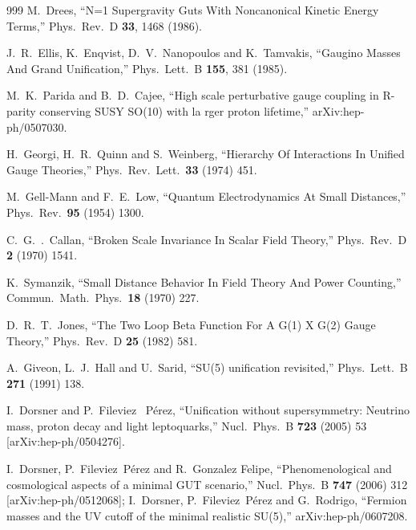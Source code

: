 \begin{thebibliography}{999}
  M.~Drees,
  ``N=1 Supergravity Guts With Noncanonical Kinetic Energy Terms,''
  Phys.\ Rev.\ D {\bf 33}, 1468 (1986).

  J.~R.~Ellis, K.~Enqvist, D.~V.~Nanopoulos and K.~Tamvakis,
  ``Gaugino Masses And Grand Unification,''
  Phys.\ Lett.\ B {\bf 155}, 381 (1985).

  M.~K.~Parida and B.~D.~Cajee,
  ``High scale perturbative gauge coupling in R-parity conserving SUSY SO(10)
  with la
  rger proton lifetime,''
  arXiv:hep-ph/0507030.

  H.~Georgi, H.~R.~Quinn and S.~Weinberg,
  ``Hierarchy Of Interactions In Unified Gauge Theories,''
  Phys.\ Rev.\ Lett.\  {\bf 33} (1974) 451.

  M.~Gell-Mann and F.~E.~Low,
  ``Quantum Electrodynamics At Small Distances,''
  Phys.\ Rev.\  {\bf 95} (1954) 1300.

  C.~G.~.~Callan,
  ``Broken Scale Invariance In Scalar Field Theory,''
  Phys.\ Rev.\ D {\bf 2} (1970) 1541.

  K.~Symanzik,
  ``Small Distance Behavior In Field Theory And Power Counting,''
  Commun.\ Math.\ Phys.\  {\bf 18} (1970) 227.

  D.~R.~T.~Jones,
  ``The Two Loop Beta Function For A G(1) X G(2) Gauge Theory,''
  Phys.\ Rev.\ D {\bf 25} (1982) 581.

  A.~Giveon, L.~J.~Hall and U.~Sarid,
  ``SU(5) unification revisited,''
  Phys.\ Lett.\ B {\bf 271} (1991) 138.

  I.~Dorsner and P.~Fileviez ~P\'erez,
  ``Unification without supersymmetry: Neutrino mass, proton decay and light
  leptoquarks,''
  Nucl.\ Phys.\ B {\bf 723} (2005) 53
  [arXiv:hep-ph/0504276].

I.~Dorsner, P.~Fileviez~P\'erez and R.~Gonzalez Felipe,
  ``Phenomenological and cosmological aspects of a minimal GUT scenario,''
  Nucl.\ Phys.\ B {\bf 747} (2006) 312
  [arXiv:hep-ph/0512068];
I.~Dorsner, P.~Fileviez~P\'erez and G.~Rodrigo,
  ``Fermion masses and the UV cutoff of the minimal realistic SU(5),''
  arXiv:hep-ph/0607208.


\end{thebibliography}
